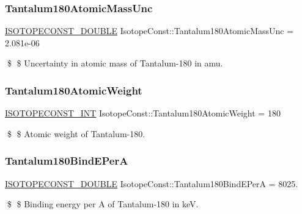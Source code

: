 \subsubsection{\texorpdfstring{Tantalum180\+Atomic\+Mass\+Unc}{Tantalum180AtomicMassUnc}}
{\footnotesize\ttfamily \mbox{\hyperlink{group___isotope_const-_macros_ga8f45a7272ce02c0b4c65c44636ed719a}{I\+S\+O\+T\+O\+P\+E\+C\+O\+N\+S\+T\+\_\+\+D\+O\+U\+B\+LE}} Isotope\+Const\+::\+Tantalum180\+Atomic\+Mass\+Unc = 2.\+081e-\/06}

\$ \$ Uncertainty in atomic mass of Tantalum-\/180 in amu. \mbox{\label{group___isotope_const-_tantalum-_ta180_gad64d9a3e17a1df04673b73d1355d50a8}} 
\subsubsection{\texorpdfstring{Tantalum180\+Atomic\+Weight}{Tantalum180AtomicWeight}}
{\footnotesize\ttfamily \mbox{\hyperlink{group___isotope_const-_macros_ga5f18360b3e99483a35c32d789e62621c}{I\+S\+O\+T\+O\+P\+E\+C\+O\+N\+S\+T\+\_\+\+I\+NT}} Isotope\+Const\+::\+Tantalum180\+Atomic\+Weight = 180}

\$ \$ Atomic weight of Tantalum-\/180. \mbox{\label{group___isotope_const-_tantalum-_ta180_gaa6c5805c6fe2347aa289ca2d3da4fb55}} 
\subsubsection{\texorpdfstring{Tantalum180\+Bind\+E\+PerA}{Tantalum180BindEPerA}}
{\footnotesize\ttfamily \mbox{\hyperlink{group___isotope_const-_macros_ga8f45a7272ce02c0b4c65c44636ed719a}{I\+S\+O\+T\+O\+P\+E\+C\+O\+N\+S\+T\+\_\+\+D\+O\+U\+B\+LE}} Isotope\+Const\+::\+Tantalum180\+Bind\+E\+PerA = 8025.}

\$ \$ Binding energy per A of Tantalum-\/180 in keV. \mbox{\label{group___isotope_const-_tantalum-_ta180_gae4813ecc150c489f7efcc975aac0a84a}} 
